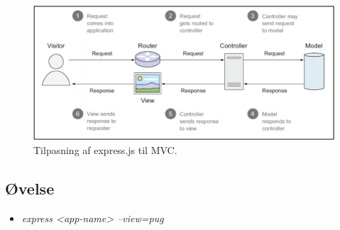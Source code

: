 \begin{figure}[h]
	\centering
	\includegraphics[width=0.9\linewidth]{figs/spm2/mean-mvc}
	\caption{Tilpasning af express.js til MVC.}
	\label{fig:mean-mvc}
\end{figure}

\subsection{Øvelse}

\begin{itemize}
	\item \textit{express <app-name> --view=pug}
\end{itemize}
